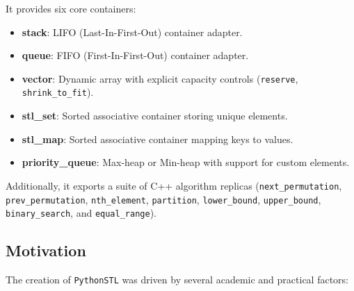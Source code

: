 \documentclass[11pt,a4paper]{article}
\begin{document}
It provides six core containers:
\begin{itemize}
    \item \textbf{stack}: LIFO (Last-In-First-Out) container adapter.
    \item \textbf{queue}: FIFO (First-In-First-Out) container adapter.
    \item \textbf{vector}: Dynamic array with explicit capacity controls (\texttt{reserve}, \texttt{shrink\_to\_fit}).
    \item \textbf{stl\_set}: Sorted associative container storing unique elements.
    \item \textbf{stl\_map}: Sorted associative container mapping keys to values.
    \item \textbf{priority\_queue}: Max-heap or Min-heap with support for custom elements.
\end{itemize}

Additionally, it exports a suite of C++ algorithm replicas (\texttt{next\_permutation}, \texttt{prev\_permutation}, \texttt{nth\_element}, \texttt{partition}, \texttt{lower\_bound}, \texttt{upper\_bound}, \texttt{binary\_search}, and \texttt{equal\_range}).

\subsection{Motivation}
The creation of \texttt{PythonSTL} was driven by several academic and practical factors:
\end{document}
